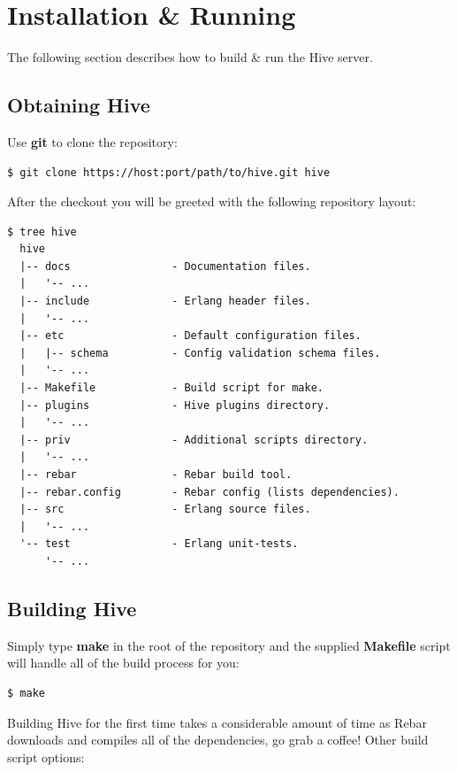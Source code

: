 \documentclass[a4paper]{article}
\begin{document}
\pagebreak
\section{Installation \& Running}
\label{sec-2}

The following section describes how to build \& run the Hive server.
\subsection{Obtaining Hive}
\label{sec-2-1}

Use \textbf{git} to clone the repository:


\begin{verbatim}
$ git clone https://host:port/path/to/hive.git hive
\end{verbatim}



\noindent
After the checkout you will be greeted with the following repository layout:


\begin{verbatim}
$ tree hive
  hive
  |-- docs                - Documentation files.
  |   '-- ...
  |-- include             - Erlang header files.
  |   '-- ...
  |-- etc                 - Default configuration files.
  |   |-- schema          - Config validation schema files.
  |   '-- ...
  |-- Makefile            - Build script for make.
  |-- plugins             - Hive plugins directory.
  |   '-- ...
  |-- priv                - Additional scripts directory.
  |   '-- ...
  |-- rebar               - Rebar build tool.
  |-- rebar.config        - Rebar config (lists dependencies).
  |-- src                 - Erlang source files.
  |   '-- ...
  '-- test                - Erlang unit-tests.
      '-- ...
\end{verbatim}
\subsection{Building Hive}
\label{sec-2-2}

Simply type \textbf{make} in the root of the repository and the supplied \textbf{Makefile} script will handle all of the build process for you:


\begin{verbatim}
$ make
\end{verbatim}



\noindent
Building Hive for the first time takes a considerable amount of time as Rebar downloads and compiles all of the dependencies, go grab a coffee! Other build script options:
\end{document}
